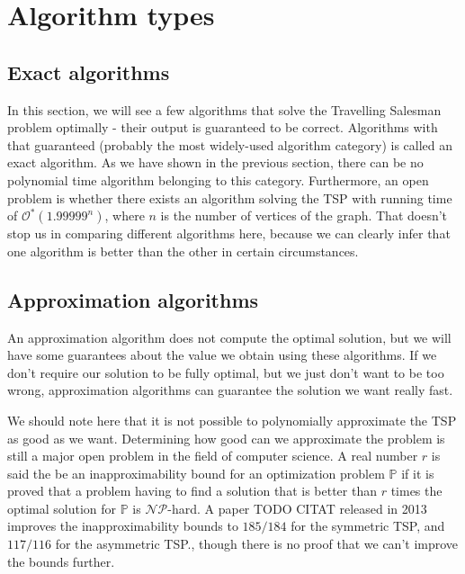 \documentclass[12pt,twoside,notitlepage]{report}
\begin{document}
\section{Algorithm types}

\subsection{Exact algorithms}

In this section, we will see a few algorithms that solve the Travelling Salesman problem optimally - their output is guaranteed to be correct. Algorithms with that guaranteed (probably the most widely-used algorithm category) is called an exact algorithm. As we have shown in the previous section, there can be no polynomial time algorithm belonging to this category. Furthermore, an open problem is whether there exists an algorithm solving the TSP with running time of $\mathcal{O^{*}}(1.99999^{n})$\cite{Woeginger2003}, where $n$ is the number of vertices of the graph. That doesn't stop us in comparing different algorithms here, because we can clearly infer that one algorithm is better than the other in certain circumstances.

\subsection{Approximation algorithms}

An approximation algorithm does not compute the optimal solution, but we will have some guarantees about the value we obtain using these algorithms. If we don't require our solution to be fully optimal, but we just don't want to be too wrong, approximation algorithms can guarantee the solution we want really fast.

\smallskip

We should note here that it is not possible to polynomially approximate the TSP as good as we want. Determining how good can we approximate the problem is still a major open problem in the field of computer science. A real number $r$ is said the be an inapproximability bound for an optimization problem $\mathbb{P}$ if it is proved that a problem having to find a solution that is better than $r$ times the optimal solution for $\mathbb{P}$ is $\mathcal{NP}$-hard. A paper TODO CITAT released in 2013 improves the inapproximability bounds to $185/184$ for the symmetric TSP, and $117/116$ for the asymmetric TSP., though there is no proof that we can't improve the bounds further.
\end{document}
